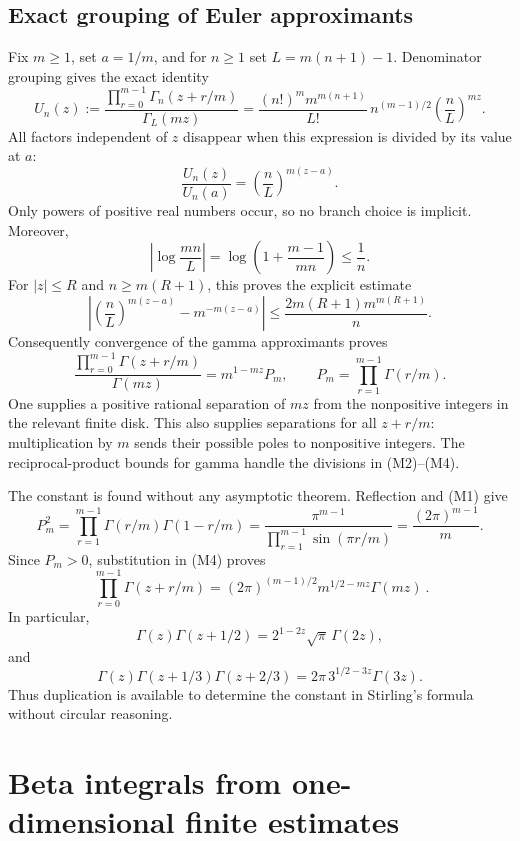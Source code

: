 \subsection{Exact grouping of Euler approximants}

Fix \(m\ge1\), set \(a=1/m\), and for \(n\ge1\) set
\(L=m(n+1)-1\). Denominator grouping gives the exact identity
\[
 U_n(z):=\frac{\prod_{r=0}^{m-1}\Gamma_n(z+r/m)}{\Gamma_L(mz)}
   =\frac{(n!)^m m^{m(n+1)}}{L!}\,
       n^{(m-1)/2}\left(\frac nL\right)^{mz}.
\]
All factors independent of \(z\) disappear when this expression is
divided by its value at \(a\):
\[
 \frac{U_n(z)}{U_n(a)}
                 =\left(\frac nL\right)^{m(z-a)}.        \tag{M2}
\]
Only powers of positive real numbers occur, so no branch choice is
implicit. Moreover,
\[
 \left|\log\frac{mn}{L}\right|
   =\log\left(1+\frac{m-1}{mn}\right)\le\frac1n.
\]
For \(|z|\le R\) and \(n\ge m(R+1)\), this proves the explicit
estimate
\[
 \left|\left(\frac nL\right)^{m(z-a)}
           -m^{-m(z-a)}\right|
 \le\frac{2m(R+1)m^{m(R+1)}}n.                           \tag{M3}
\]
Consequently convergence of the gamma approximants proves
\[
 \frac{\prod_{r=0}^{m-1}\Gamma(z+r/m)}{\Gamma(mz)}
   = m^{1-mz} P_m,
 \qquad P_m=\prod_{r=1}^{m-1}\Gamma(r/m).                \tag{M4}
\]
One supplies a positive rational separation of \(mz\) from the
nonpositive integers in the relevant finite disk. This also supplies
separations for all \(z+r/m\): multiplication by \(m\) sends their
possible poles to nonpositive integers. The reciprocal-product bounds
for gamma handle the divisions in (M2)--(M4).

The constant is found without any asymptotic theorem. Reflection and
(M1) give
\[
 P_m^2=\prod_{r=1}^{m-1}
          \Gamma(r/m)\Gamma(1-r/m)
       =\frac{\pi^{m-1}}{\prod_{r=1}^{m-1}\sin(\pi r/m)}
       =\frac{(2\pi)^{m-1}}m.
\]
Since \(P_m>0\), substitution in (M4) proves
\[
 \boxed{\ \prod_{r=0}^{m-1}\Gamma(z+r/m)
       =(2\pi)^{(m-1)/2}m^{1/2-mz}\Gamma(mz)\ }.        \tag{M5}
\]
In particular,
\[
 \Gamma(z)\Gamma(z+1/2)
       =2^{1-2z}\sqrt\pi\,\Gamma(2z),                   \tag{M6}
\]
and
\[
 \Gamma(z)\Gamma(z+1/3)\Gamma(z+2/3)
       =2\pi\,3^{1/2-3z}\Gamma(3z).                    \tag{M7}
\]
Thus duplication is available to determine the constant in Stirling's
formula without circular reasoning.

\section{Beta integrals from one-dimensional finite estimates}

